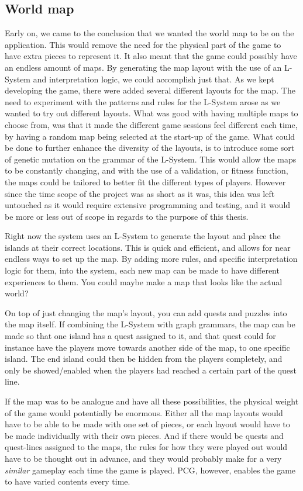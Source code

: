 \subsection{World map}
Early on, we came to the conclusion that we wanted the world map to be on the application. This would remove the need for the 
physical part of the game to have extra pieces to represent it. It also meant that the game could possibly have an endless 
amount of maps. By generating the map layout with the use of an L-System and interpretation logic, we could accomplish just 
that. As we kept developing the game, there were added several different layouts for the map. The need to experiment with 
the patterns and rules for the L-System arose as we wanted to try out different layouts. What was good with having multiple 
maps to choose from, was that it made the different game sessions feel different each time, by having a random map being 
selected at the start-up of the game. What could be done to further enhance the diversity of the layouts, is to introduce some 
sort of genetic mutation on the grammar of the L-System. This would allow the maps to be constantly changing, and with the use 
of a validation, or fitness function, the maps could be tailored to better fit the different types of players. However since the 
time scope of the project was as short as it was, this idea was left untouched as it would require extensive programming and testing, 
and it would be more or less out of scope in regards to the purpose of this thesis.

Right now the system uses an L-System to generate the layout and place the islands at their correct locations.
 This is quick and efficient, and allows for near endless ways to set up the map. By adding more rules, and specific 
 interpretation logic for them, into the system, each new map can be made to have different experiences to them. 
 You could maybe make a map that looks like the actual world? 

On top of just changing the map's layout, you can add quests and puzzles into the map itself. 
If combining the L-System with graph grammars, the map can be made so that one island has a quest assigned to it, 
and that quest could for instance have the players move towards another side of the map, to one specific island. 
The end island could then be hidden from the players completely, and only be showed/enabled when the players 
had reached a certain part of the quest line.

If the map was to be analogue and have all these possibilities, the physical weight of the game would potentially be enormous. 
Either all the map layouts would have to be able to be made with one set of pieces, or each layout would have to be 
made individually with their own pieces. And if there would be quests and quest-lines assigned to the maps, the rules 
for how they were played out would have to be thought out in advance, and they would probably make for a very \textit{similar}
 gameplay each time the game is played. PCG, however, enables the game to have varied contents every time.

